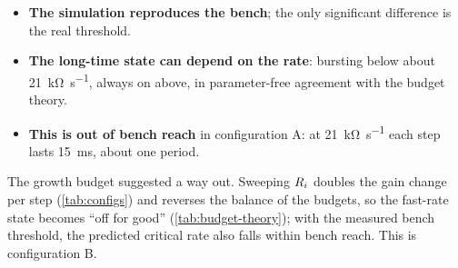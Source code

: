 \begin{learned}
\begin{itemize}[leftmargin=1.2em]
  \item \textbf{The simulation reproduces the bench}; the only significant difference is the real
        threshold.
  \item \textbf{The long-time state can depend on the rate}: bursting below about
        \SI{21}{\kilo\ohm\per\second}, always on above, in parameter-free agreement with the budget theory.
  \item \textbf{This is out of bench reach} in configuration A: at \SI{21}{\kilo\ohm\per\second} each step
        lasts \SI{15}{\milli\second}, about one period.
\end{itemize}
\end{learned}

The growth budget suggested a way out. Sweeping $R_{i}$ doubles the gain change per step
(\cref{tab:configs}) and reverses the balance of the budgets, so the fast-rate state becomes ``off for
good'' (\cref{tab:budget-theory}); with the measured bench threshold, the predicted critical rate also
falls within bench reach. This is configuration B.
